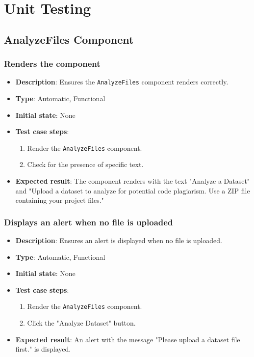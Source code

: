 \documentclass[12pt, titlepage]{article}
\begin{document}
\section{Unit Testing}
\subsection{AnalyzeFiles Component}

\subsubsection{Renders the component}
\begin{itemize}
    \item \textbf{Description}: Ensures the \texttt{AnalyzeFiles} component renders correctly.
    \item \textbf{Type}: Automatic, Functional
    \item \textbf{Initial state}: None
    \item \textbf{Test case steps}:
    \begin{enumerate}
        \item Render the \texttt{AnalyzeFiles} component.
        \item Check for the presence of specific text.
    \end{enumerate}
    \item \textbf{Expected result}: The component renders with the text "Analyze a Dataset" and "Upload a dataset to analyze for potential code plagiarism. Use a ZIP file containing your project files."
\end{itemize}

\subsubsection{Displays an alert when no file is uploaded}
\begin{itemize}
    \item \textbf{Description}: Ensures an alert is displayed when no file is uploaded.
    \item \textbf{Type}: Automatic, Functional
    \item \textbf{Initial state}: None
    \item \textbf{Test case steps}:
    \begin{enumerate}
        \item Render the \texttt{AnalyzeFiles} component.
        \item Click the "Analyze Dataset" button.
    \end{enumerate}
    \item \textbf{Expected result}: An alert with the message "Please upload a dataset file first." is displayed.
\end{itemize}
\end{document}
